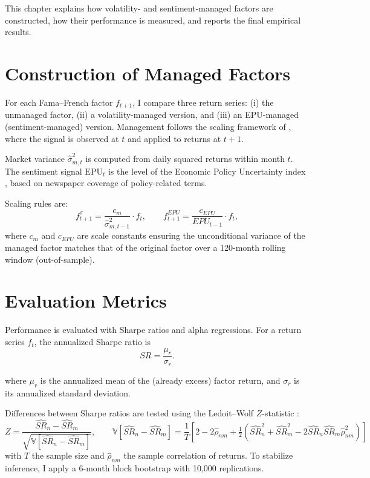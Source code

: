 This chapter explains how volatility- and sentiment-managed factors are constructed, how their performance is measured, and reports the final empirical results.

\section{Construction of Managed Factors}

For each Fama–French factor $f_{t+1}$, I compare three return series: (i) the unmanaged factor, (ii) a volatility-managed version, and (iii) an EPU-managed (sentiment-managed) version. Management follows the scaling framework of \citet{moreira2017}, where the signal is observed at $t$ and applied to returns at $t+1$.

Market variance $\widehat{\sigma}^{2}_{m,t}$ is computed from daily squared returns within month $t$. The sentiment signal $\text{EPU}_{t}$ is the level of the Economic Policy Uncertainty index \citep{baker2019}, based on newspaper coverage of policy-related terms.

Scaling rules are:
\begin{equation}
f^{\sigma}_{t+1} = \frac{c_m}{\widehat{\sigma}^2_{m,t-1}} \cdot f_t,
\qquad
f^{EPU}_{t+1} = \frac{c_{EPU}}{EPU_{t-1}} \cdot f_t,
\tag{1}
\end{equation}
where $c_m$ and $c_{EPU}$ are scale constants ensuring the unconditional variance of the managed factor matches that of the original factor over a 120-month rolling window (out-of-sample).

\section{Evaluation Metrics}

Performance is evaluated with Sharpe ratios and alpha regressions. For a return series $f_t$, the annualized Sharpe ratio is
\begin{equation}
SR = \frac{\mu_r}{\sigma_r}.
\tag{2}
\end{equation}

where $\mu_r$ is the annualized mean of the (already excess) factor return, and $\sigma_r$ is its annualized standard deviation.

Differences between Sharpe ratios are tested using the Ledoit–Wolf $Z$-statistic \citep{ledoit2008}:
\begin{equation}
Z = \frac{\widehat{SR}_n - \widehat{SR}_m}
     {\sqrt{\mathbb{V}[\widehat{SR}_n - \widehat{SR}_m]}},
\qquad
\mathbb{V}[\widehat{SR}_n - \widehat{SR}_m] =
\frac{1}{T}\!\left[ 2 - 2\widehat{\rho}_{nm}
+ \tfrac{1}{2}\!\left(\widehat{SR}_n^{2} + \widehat{SR}_m^{2}
- 2\widehat{SR}_n \widehat{SR}_m \widehat{\rho}_{nm}^{2}\right)\right]
\tag{3}
\end{equation}
with $T$ the sample size and $\widehat{\rho}_{nm}$ the sample correlation of returns. To stabilize inference, I apply a 6-month block bootstrap with 10,000 replications.

